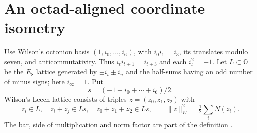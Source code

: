 \section{An octad-aligned coordinate isometry}
Use Wilson's octonion basis $(1,i_0,\ldots,i_6)$, with $i_0i_1=i_3$, its translates modulo seven, and anticommutativity. Thus $i_ti_{t+1}=i_{t+3}$ and each $i_t^2=-1$. Let $L\subset\mathbb O$ be the $E_8$ lattice generated by $\pm i_t\pm i_u$ and the half-sums having an odd number of minus signs; here $i_\infty=1$. Put
\[
s=(-1+i_0+\cdots+i_6)/2.
\]
Wilson's Leech lattice consists of triples $z=(z_0,z_1,z_2)$ with
\begin{equation}\label{P2:eq:wilson}
z_i\in L,\quad z_i+z_j\in L\bar s,\quad z_0+z_1+z_2\in Ls,
\qquad \|z\|_W^2=\tfrac12\sum_iN(z_i).
\end{equation}
The bar, side of multiplication and norm factor are part of the definition \cite[Sections 2--4]{wilson}.

